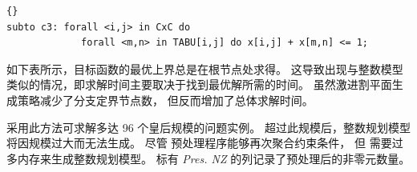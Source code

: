 \medskip
\begin{lstlisting}[firstnumber=13]{}
subto c3: forall <i,j> in CxC do
             forall <m,n> in TABU[i,j] do x[i,j] + x[m,n] <= 1;
\end{lstlisting}

\medskip
\noindent 如下表所示，目标函数的最优上界总是在根节点处求得。
这导致出现与整数模型类似的情况，即求解时间主要取决于找到最优解所需的时间。
虽然激进割平面生成策略减少了分支定界节点数，
但反而增加了总体求解时间。

\noindent 采用此方法可求解多达 96 个皇后规模的问题实例。
超过此规模后，整数规划模型将因规模过大而无法生成。
尽管 \cplex 预处理程序能够再次聚合约束条件，
但 \zimpl 需要过多内存来生成整数规划模型。
标有 \emph{Pres. NZ} 的列记录了预处理后的非零元数量。

